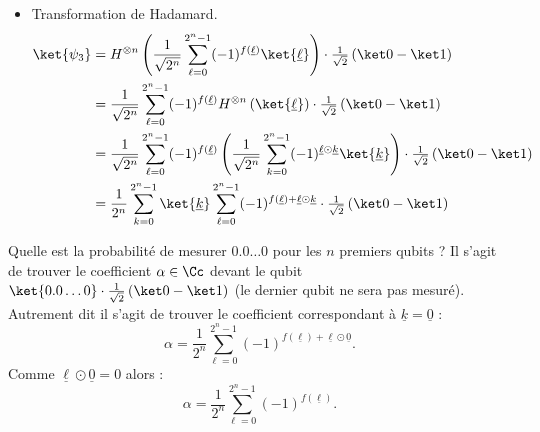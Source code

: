 \documentclass[11pt,class=report,crop=false]{standalone}
\begin{document}
\begin{itemize}
  \item Transformation de Hadamard.
\begin{align*}
\ket{\psi_3} 
  &=  H^{\otimes n}\left( \frac{1}{\sqrt{2^{n}}}\sum_{\ell=0}^{2^n-1} (-1)^{f(\underline\ell)} \ket{\underline\ell} \right) \cdot \tfrac{1}{\sqrt{2}}\left(\ket0 - \ket1\right)  \\
  &=  \frac{1}{\sqrt{2^{n}}}\sum_{\ell=0}^{2^n-1} (-1)^{f(\underline\ell)} H^{\otimes n}\left( \ket{\underline\ell} \right) \cdot \tfrac{1}{\sqrt{2}}\left(\ket0 - \ket1\right)  \\
  &=  \frac{1}{\sqrt{2^{n}}}\sum_{\ell=0}^{2^n-1} (-1)^{f(\underline\ell)} \left(
\frac{1}{\sqrt{2^n}} \sum_{k=0}^{2^n-1}  (-1)^{\underline \ell \odot \underline{k} } \ket{\underline k}
 \right) \cdot \tfrac{1}{\sqrt{2}}\left(\ket0 - \ket1\right)  \\
  &=  \frac{1}{2^{n}}\sum_{k=0}^{2^n-1} \ket{\underline k}
 \sum_{\ell=0}^{2^n-1} (-1)^{f(\underline\ell) + \underline \ell \odot \underline{k}}   \cdot \tfrac{1}{\sqrt{2}}\left(\ket0 - \ket1\right) \\
\end{align*}

\end{itemize}

Quelle est la probabilité de mesurer $0.0\ldots0$ pour les $n$ premiers qubits ?
Il s'agit de trouver le coefficient $\alpha\in\Cc$ devant le qubit $\ket{0.0\ldots0} \cdot \tfrac{1}{\sqrt{2}}\left(\ket0 - \ket1\right)$ (le dernier qubit ne sera pas mesuré).
Autrement dit il s'agit de trouver le coefficient correspondant à $\underline k = \underline 0$ :
$$\alpha =  \frac{1}{2^{n}}\sum_{\ell=0}^{2^n-1} (-1)^{f(\underline\ell) + \underline \ell \odot \underline{0}}.$$
Comme $\underline \ell \odot \underline{0} = 0$ alors :
$$\alpha =  \frac{1}{2^{n}}\sum_{\ell=0}^{2^n-1} (-1)^{f(\underline\ell)}.$$
\end{document}
